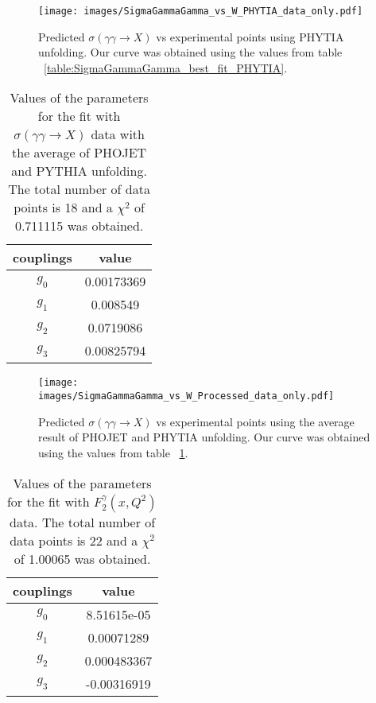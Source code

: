 \documentclass[preprint, 12pt]{elsarticle}
\begin{document}
\begin{figure}[!h]
\center
\texttt{[image: images/SigmaGammaGamma\_vs\_W\_PHYTIA\_data\_only.pdf]} 
\caption{Predicted $\sigma\left(\gamma \gamma \rightarrow X\right)$ vs experimental points using PHYTIA unfolding. Our curve was obtained using the values from table ~\ref{table:SigmaGammaGamma_best_fit_PHYTIA}.}
\label{fig:SigmaGammaGamma_best_fit_PHYTIA_data_only}
\end{figure}

\begin{table}[b!]
\centering
\caption{Values of the parameters for the fit with $\sigma\left(\gamma \gamma \rightarrow X\right)$ data with the average of PHOJET and PYTHIA unfolding. The total number of data points is 18 and a $\chi^2$ of 0.711115 was obtained.}
\vspace{0.5cm}
\begin{tabular}{|c|c|}
\hline
couplings   & value \\
\hline
$g_0$  & 0.00173369 \\ 
\hline
$g_1$  & 0.008549 \\ 
\hline
$g_2$  &  0.0719086 \\
\hline
$g_3$  &  0.00825794\\ 
\hline
\end{tabular}
\label{table:SigmaGammaGamma_best_fit_Processed}
\end{table}

\begin{figure}[!h]
\center
\texttt{[image: images/SigmaGammaGamma\_vs\_W\_Processed\_data\_only.pdf]} 
\caption{Predicted $\sigma\left(\gamma \gamma \rightarrow X\right)$ vs experimental points using the average result of PHOJET and PHYTIA unfolding. Our curve was obtained using the values from table ~\ref{table:SigmaGammaGamma_best_fit_Processed}.}
\label{fig:SigmaGammaGamma_best_fit_Processed_data_only}
\end{figure}


\begin{table}[b!]
\centering
\caption{Values of the parameters for the fit with $F_2^{\gamma}\left(x, Q^2\right)$ data. The total number of data points is 22 and a $\chi^2$ of 1.00065 was obtained.}
\vspace{0.5cm}
\begin{tabular}{|c|c|}
\hline
couplings   & value \\
\hline
$g_0$  & 8.51615e-05\\ 
\hline
$g_1$  & 0.00071289 \\ 
\hline
$g_2$  & 0.000483367  \\
\hline
$g_3$  & -0.00316919\\ 
\hline
\end{tabular}
\label{table:F2Photon_best_fit}
\end{table}
\end{document}
